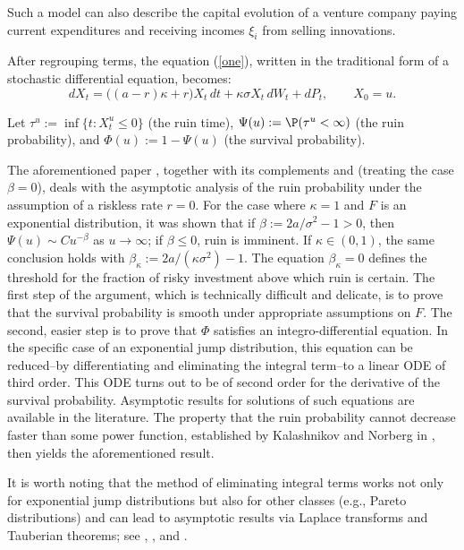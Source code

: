 Such a model can also describe the capital evolution of a venture company paying current expenditures and receiving incomes $\xi_i$ from selling innovations.

After regrouping terms, the equation (\ref{one}), written in the traditional form of a stochastic differential equation, becomes:
\begin{equation}\label{two}
dX_t = \big( (a-r)\kappa + r\big) X_t\,dt + \kappa\sigma X_t\,dW_t + dP_t, \qquad X_0 = u.
\end{equation}

Let $\tau^u := \inf \{t: X^u_t \le 0\}$ (the ruin time), $\Psi(u) := \P(\tau^u < \infty)$ (the ruin probability), and $\Phi(u) := 1 - \Psi(u)$ (the survival probability).

The aforementioned paper \cite{KP2016}, together with its complements \cite{PZ} and \cite{PerErr} (treating the case $\beta=0$), deals with the asymptotic analysis of the ruin probability under the assumption of a riskless rate $r=0$. For the case where $\kappa=1$ and $F$ is an exponential distribution, it was shown that if $\beta := 2a/\sigma^2 - 1 > 0$, then $\Psi(u) \sim C u^{-\beta}$ as $u \to \infty$; if $\beta \le 0$, ruin is imminent. If $\kappa \in (0,1)$, the same conclusion holds with $\beta_\kappa := 2a/(\kappa\sigma^2) - 1$. The equation $\beta_\kappa = 0$ defines the threshold for the fraction of risky investment above which ruin is certain. The first step of the argument, which is technically difficult and delicate, is to prove that the survival probability is smooth under appropriate assumptions on $F$. The second, easier step is to prove that $\Phi$ satisfies an integro-differential equation. In the specific case of an exponential jump distribution, this equation can be reduced--by differentiating and eliminating the integral term--to a linear ODE of third order. This ODE turns out to be of second order for the derivative of the survival probability. Asymptotic results for solutions of such equations are available in the literature. The property that the ruin probability cannot decrease faster than some power function, established by Kalashnikov and Norberg in \cite{Kalash-Nor}, then yields the aforementioned result.

It is worth noting that the method of eliminating integral terms works not only for exponential jump distributions but also for other classes (e.g., Pareto distributions) and can lead to asymptotic results via Laplace transforms and Tauberian theorems; see \cite{ABL}, \cite{ACT}, and \cite{A2025}.

